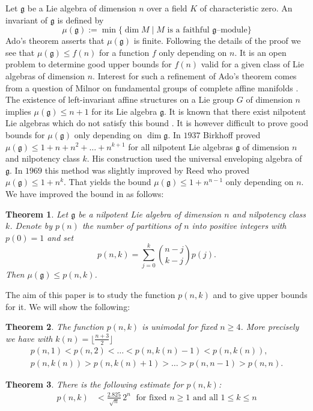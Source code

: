 \documentclass[12pt]{amsart}
\newtheorem{thm}{Theorem}[section]
\theoremstyle{definition}
\theoremstyle{remark}
\newcommand{\Lg}{\mathfrak{g}}
\begin{document}
Let $\Lg$ be a Lie algebra of dimension $n$ over a field $K$ of
characteristic zero. An invariant of $\Lg$ is defined by
$$\mu (\Lg):=\min \{\dim M \mid M \text{ is a faithful $\Lg$--module}\}$$   
Ado's theorem asserts that $\mu(\Lg)$ is finite. Following the details of
the proof we see that $\mu(\Lg)\le f(n)$ for a function $f$ only
depending on $n$.
It is an open problem to determine good upper bounds for $f(n)$
valid for a given class of Lie algebras of dimension $n$.
Interest for such a refinement of Ado's theorem  
comes from a question of Milnor on fundamental groups of complete
affine manifolds \cite{M2}.
The existence of left-invariant affine structures on a Lie group $G$
of dimension $n$ implies $\mu(\Lg)\le n+1$ for its Lie algebra $\Lg$. 
It is known that there exist nilpotent Lie algebras which do not
satisfy this bound \cite{BG}. It is however difficult to prove good bounds
for $\mu (\Lg)$ only depending on $\dim \Lg$.
In $1937$ Birkhoff \cite{BIR} proved $\mu(\Lg)\le 1+n+n^2+\dots+n^{k+1}$
for all nilpotent Lie algebras $\Lg$ of dimension $n$ and 
nilpotency class $k$.
His construction used the universal enveloping algebra of $\Lg$.
In $1969$ this method was slightly improved by Reed \cite{REE} who
proved  $\mu(\Lg)\le 1+n^k$. 
That yields the bound $\mu(\Lg)\le 1+n^{n-1}$
only depending on $n$.
We have improved the bound in \cite{BU5} as follows:
\begin{thm}\label{th1}
Let $\Lg$ be a nilpotent Lie algebra of dimension $n$ and nilpotency class
$k$. Denote by $p(n)$ the number of partitions of 
$n$ into positive integers with $p(0)=1$ and set  
$$p(n,k)=\sum_{j=0}^{k}\binom{n-j}{k-j}p(j).$$
Then $\mu(\Lg)\le p(n,k)$.
\end{thm} 

The aim of this paper is to study the function $p(n,k)$ and to give
upper bounds for it. We will show the following: 

\begin{thm}\label{th2}
The function $p(n,k)$ is unimodal for fixed $n\ge 4$. More precisely we
have with $k(n)=\lfloor \frac{n+3}{2} \rfloor$
\begin{gather*}
p(n,1)<p(n,2)<\dots <p(n,k(n)-1)< p(n,k(n)),\\
p(n,k(n)) > p(n,k(n)+1)> \dots > p(n,n-1)>p(n,n).
\end{gather*}    
\end{thm}
\begin{thm}\label{th3}
There is the following estimate for $p(n,k)$:
\begin{align*}
p(n,k) & < \frac{2.825}{\sqrt{n}}\, 2^n \;\text{ for fixed $n\ge 1$ and all }
1\le k\le n
\end{align*}
\end{thm}
\end{document}
